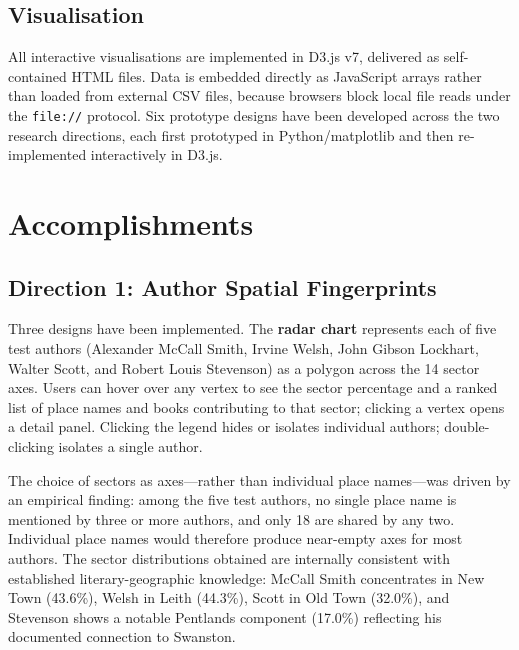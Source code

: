 \documentclass[11pt,a4paper]{article}
\begin{document}
\subsection*{Visualisation}

All interactive visualisations are implemented in D3.js v7, delivered as self-contained HTML files. Data is embedded directly as JavaScript arrays rather than loaded from external CSV files, because browsers block local file reads under the \texttt{file://} protocol. Six prototype designs have been developed across the two research directions, each first prototyped in Python/matplotlib and then re-implemented interactively in D3.js.

\section{Accomplishments}

\subsection*{Direction 1: Author Spatial Fingerprints}

Three designs have been implemented. The \textbf{radar chart} represents each of five test authors (Alexander McCall Smith, Irvine Welsh, John Gibson Lockhart, Walter Scott, and Robert Louis Stevenson) as a polygon across the 14 sector axes. Users can hover over any vertex to see the sector percentage and a ranked list of place names and books contributing to that sector; clicking a vertex opens a detail panel. Clicking the legend hides or isolates individual authors; double-clicking isolates a single author.

The choice of sectors as axes---rather than individual place names---was driven by an empirical finding: among the five test authors, no single place name is mentioned by three or more authors, and only 18 are shared by any two. Individual place names would therefore produce near-empty axes for most authors. The sector distributions obtained are internally consistent with established literary-geographic knowledge: McCall Smith concentrates in New Town (43.6\%), Welsh in Leith (44.3\%), Scott in Old Town (32.0\%), and Stevenson shows a notable Pentlands component (17.0\%) reflecting his documented connection to Swanston.
\end{document}
